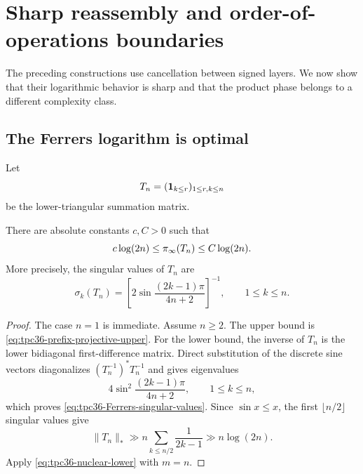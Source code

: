 \section{Sharp reassembly and order-of-operations boundaries}
\label{sec:tpc36-optimality}

The preceding constructions use cancellation between signed layers.  We
now show that their logarithmic behavior is sharp and that the product
phase belongs to a different complexity class.

\subsection{The Ferrers logarithm is optimal}

Let
\begin{equation}
 T_n=(\mathbf 1_{k\le r})_{1\le r,k\le n}
 \label{eq:tpc36-triangular-matrix}
\end{equation}
be the lower-triangular summation matrix.

\begin{theorem}
\label{thm:tpc36-Ferrers-optimal}
There are absolute constants \(c,C>0\) such that
\begin{equation}
 c\log(2n)\le\pi_{\infty}(T_n)\le C\log(2n).
 \label{eq:tpc36-Ferrers-theta-log}
\end{equation}
More precisely, the singular values of \(T_n\) are
\begin{equation}
 \boxed{
 \sigma_k(T_n)
 =\left[
 2\sin\frac{(2k-1)\pi}{4n+2}
 \right]^{-1},
 \qquad1\le k\le n.}
 \label{eq:tpc36-Ferrers-singular-values}
\end{equation}
\end{theorem}

\begin{proof}
The case \(n=1\) is immediate.  Assume \(n\ge2\).  The upper bound is
\eqref{eq:tpc36-prefix-projective-upper}.  For the lower bound, the
inverse of \(T_n\) is the lower bidiagonal first-difference
matrix.  Direct substitution of the discrete sine vectors diagonalizes
\((T_n^{-1})^*T_n^{-1}\) and gives eigenvalues
\begin{equation}
 4\sin^2\frac{(2k-1)\pi}{4n+2},
 \qquad1\le k\le n,
 \label{eq:tpc36-difference-eigenvalues}
\end{equation}
which proves \eqref{eq:tpc36-Ferrers-singular-values}.  Since
\(\sin x\le x\), the first \(\lfloor n/2\rfloor\) singular values give
\begin{equation}
 \|T_n\|_*
 \gg n\sum_{k\le n/2}\frac1{2k-1}
 \gg n\log(2n).
 \label{eq:tpc36-Ferrers-nuclear-lower}
\end{equation}
Apply \eqref{eq:tpc36-nuclear-lower} with \(m=n\).
\end{proof}

